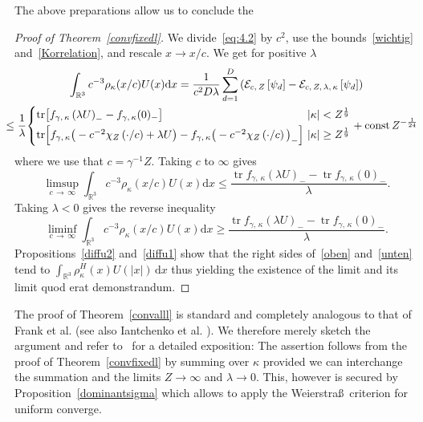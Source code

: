 \documentclass[AHL,Unicode,longabstracts,published]{cedram}
\DeclareMathOperator{\tr}{tr}
\DeclareMathOperator{\const}{const}
\newcommand*\rd{\mathrm{d}}
\newcommand*\dx{\mathrm{d}x}
\newcommand*\rz{\mathbb{R}}
\newcommand*\cE{\mathcal{E}}
\begin{document}
The above preparations allow us to conclude the
\begin{proof}[Proof of Theorem~\ref{convfixedl}]
We divide~\eqref{eq:4.2} by $c^2$, use the bounds~\eqref{wichtig} and~\eqref{Korrelation}, and rescale $x\to x/c$. We get for positive $\lambda$
\begin{multline}\label{eq:reduced}
\int_{\rz^3}c^{-3}\rho_\kappa(x/c)U(x)\rd x =\frac1{c^2D\lambda}\sum_{d=1}^D\left(\cE_{c,\,Z}\left[\psi_d\right]-\cE_{c,\,Z,\,\lambda,\,\kappa}\left[\psi_d\right]\right) 
\\
\mkern-15mu\leq\frac1\lambda
\!
\begin{cases}
\tr\!\left[f_{\gamma,\,\kappa}\left(\lambda U\right)_{-}-f_{\gamma,\,\kappa}(0)_{-}\right] &\!\!\!\!|\kappa|<Z^\frac19\\[0.25em]
\tr\!\left[f_{\gamma,\,\kappa}\big(-c^{-2}\chi_Z\left(\cdot/c\right)+\lambda U\big)-f_{\gamma,\,\kappa}\big(-c^{-2}\chi_Z\left(\cdot/c\right)\big)_{-}\right]& \!\!\!\!|\kappa|\geq Z^\frac19
\end{cases} + \const Z^{-\frac1{24}}
\end{multline}
where we use that $c=\gamma^{-1}Z$. Taking $c$ to $\infty$ gives
\begin{equation}\label{oben}
\limsup_{c\,\to\,\infty}\int_{\rz^3}c^{-3}\rho_\kappa(x/c)U(x)\rd x
\leq \frac{\tr f_{\gamma,\,\kappa}(\lambda U)_--\tr f_{\gamma,\,\kappa}(0)_-}{\lambda}.
\end{equation}
Taking $\lambda<0$ gives the reverse inequality
\begin{equation}\label{unten}
\liminf_{c\,\to\,\infty}\int_{\rz^3}c^{-3}\rho_\kappa(x/c)U(x)\rd x
\geq \frac{\tr f_{\gamma,\,\kappa}(\lambda U)_--\tr f_{\gamma,\,\kappa}(0)_-}{\lambda}.
\end{equation}
Propositions~\ref{diffu2} and~\ref{diffu1} show that the right sides of~\eqref{oben} and~\eqref{unten} tend to $\int_{\rz^3} \rho_{\kappa}^H(x)U(|x|)\,\dx$ thus yielding the existence of the limit and its limit quod erat demonstrandum.
\end{proof}


The proof of Theorem~\ref{convalll} is standard and completely analogous to that of Frank et al. \cite[Theorem~1.2]{Franketal2020P} (see also Iantchenko et al. \cite[Theorem~2]{Iantchenkoetal1996}). We therefore merely sketch the argument and refer to~\cite[Section~1.3]{Franketal2020P} for a detailed exposition: The assertion follows from the proof of Theorem~\ref{convfixedl} by summing over $\kappa$ provided we can interchange the summation and the limits $Z\to\infty$ and $\lambda\to0$. This, however is secured by Proposition~\ref{dominantsigma} which allows to apply the Weierstra\ss~criterion for uniform converge.
\end{document}
